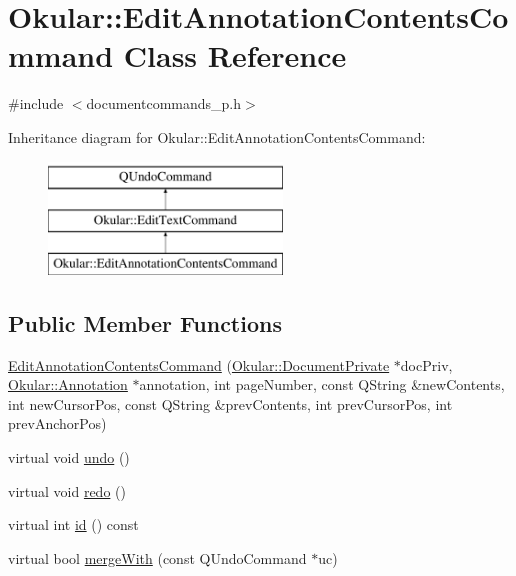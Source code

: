 \hypertarget{classOkular_1_1EditAnnotationContentsCommand}{\section{Okular\+:\+:Edit\+Annotation\+Contents\+Command Class Reference}
\label{classOkular_1_1EditAnnotationContentsCommand}
}


{\ttfamily \#include $<$documentcommands\+\_\+p.\+h$>$}

Inheritance diagram for Okular\+:\+:Edit\+Annotation\+Contents\+Command\+:\begin{figure}[H]
\begin{center}
\leavevmode
\includegraphics[height=3.000000cm]{classOkular_1_1EditAnnotationContentsCommand}
\end{center}
\end{figure}
\subsection*{Public Member Functions}
\begin{DoxyCompactItemize}
\item 
\hyperlink{classOkular_1_1EditAnnotationContentsCommand_a7cd7091566f22068a296c71796b768bd}{Edit\+Annotation\+Contents\+Command} (\hyperlink{classOkular_1_1DocumentPrivate}{Okular\+::\+Document\+Private} $\ast$doc\+Priv, \hyperlink{classOkular_1_1Annotation}{Okular\+::\+Annotation} $\ast$annotation, int page\+Number, const Q\+String \&new\+Contents, int new\+Cursor\+Pos, const Q\+String \&prev\+Contents, int prev\+Cursor\+Pos, int prev\+Anchor\+Pos)
\item 
virtual void \hyperlink{classOkular_1_1EditAnnotationContentsCommand_abe0ca19d616dea5b6589b8ab20f7d98f}{undo} ()
\item 
virtual void \hyperlink{classOkular_1_1EditAnnotationContentsCommand_ad53945e0d8b5f5419728f9a27b92d4d6}{redo} ()
\item 
virtual int \hyperlink{classOkular_1_1EditAnnotationContentsCommand_a6aa5055fdd1e82285f50efa77a0c8922}{id} () const 
\item 
virtual bool \hyperlink{classOkular_1_1EditAnnotationContentsCommand_ad3d9ba863dc36a57eb75f1aa8b9eff7c}{merge\+With} (const Q\+Undo\+Command $\ast$uc)
\end{DoxyCompactItemize}
